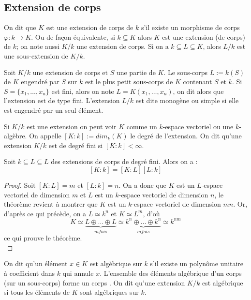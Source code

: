 \documentclass[a4paper]{article} %
\numberwithin{section}{part}
\numberwithin{equation}{section}
\begin{document}
\subsection{Extension de corps}
\label{defdegext}
On dit que $K$ est une extension de corps de $k$ s'il existe un morphisme de 
corps $\varphi : k \to K$. Ou de façon équivalente, si $k \subseteq K$ alors $K$
est une extension (de corps) de $k$; on note aussi $K/k$ une extension de corps.
Si on a $k\subseteq L \subseteq K$, alors $L/k$ est une sous-extension de
$K/k$.\par
Soit $K/k$ une extension de corps et $S$ une partie de $K$. Le sous-corps $L := 
k(S)$ de $K$ engendré par $S$ sur $k$ est le plus petit sous-corps de $K$ 
contenant $S$ et $k$. Si $S = \lbrace x_1,\dots,x_n \rbrace$ est fini, alors on 
note $L = K(x_1,\dots,x_n)$, on dit alors que l'extension est de type fini. 
L'extension $L/k$ est dite monogène ou simple si elle est engendré par un seul 
élément.\par
Si $K/k$ est une extension on peut voir $K$ comme un $k$-espace vectoriel ou une
$k$-algèbre. On appelle $[K:k] := dim_k(K)$ le degré de l'extension. On dit 
qu'une extension $K/k$ est de degré fini si $[K:k] < \infty$.\par

\begin{thm}
Soit $k \subseteq L \subseteq L$ des extensions de corps de degré fini. Alors on
a :
\[[K:k] = [K:L][L:k]\]
\end{thm}
\begin{proof}
Soit $[K:L] = m$ et $[L:k] = n$. On a donc que $K$ est un $L$-espace vectoriel 
de dimension $m$ et $L$ est un $k$-espace vectoriel de dimension $n$, le 
théorème revient à montrer que $K$ est un $k$-espace vectoriel de dimension 
$mn$. Or, d'après ce qui précède, on a $L \simeq k^n$ et $K \simeq L^m$, d'où
\[K \simeq \underbrace{L \oplus\dots\oplus L}_{m fois}\simeq\underbrace
{k^n\oplus\dots\oplus k^n}_{m fois} \simeq k^{nm}\]
ce qui prouve le théorème.\\
\end{proof}

On dit qu'un élément $x\in K$ est algèbrique sur $k$ s'il existe un polynôme 
unitaire à coefficient dans $k$ qui annule $x$. L'ensemble des éléments 
algébrique d'un corps (sur un sous-corps) forme un corps \cite[p.~64, théorème
1.14]{Per}. On dit qu'une extension $K/k$ est algébrique si tous les éléments 
de $K$ sont algébriques sur $k$.
\end{document}
